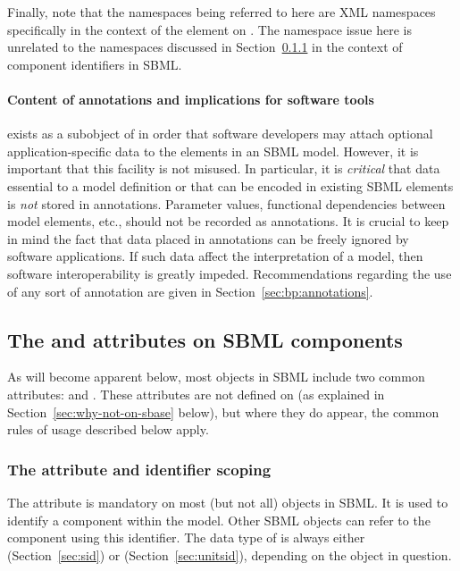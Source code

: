 Finally, note that the namespaces being referred to here are XML
namespaces specifically in the context of the 
element on \SBase.  The namespace issue here is unrelated to the
namespaces discussed in Section~\ref{sec:identifiers} in the
context of component identifiers in SBML.


\paragraph{Content of annotations and implications for software tools}

\Annotation exists as a subobject of \SBase in
order that software developers may attach optional
application-specific data to the elements in an SBML model.
However, it is important that this facility is not misused.  In
particular, it is \emph{critical} that data essential to a model
definition or that can be encoded in existing SBML elements is
\emph{not} stored in annotations.  Parameter values,
functional dependencies between model elements, etc., should not
be recorded as annotations.  It is crucial to keep in mind the
fact that data placed in annotations can be freely ignored by
software applications.  If such data affect the interpretation of
a model, then software interoperability is greatly impeded.  
Recommendations regarding the use of any sort of annotation are
given in Section~\ref{sec:bp:annotations}.  


\subsection{The  and  attributes on SBML components}
\label{sec:idnameattribs}

As will become apparent below, most objects in SBML include two
common attributes:  and .  These attributes are not
defined on \SBase (as explained in
Section~\ref{sec:why-not-on-sbase} below), but where they do
appear, the common rules of usage described below apply.


\subsubsection{The  attribute and identifier scoping}
\label{sec:identifiers}

The  attribute is mandatory on most (but not all)
objects in SBML.  It is used to identify a component within the
model.  Other SBML objects can refer to the component using this
identifier.  The data type of  is always either
 (Section~\ref{sec:sid}) or 
(Section~\ref{sec:unitsid}), depending on the object in question.

